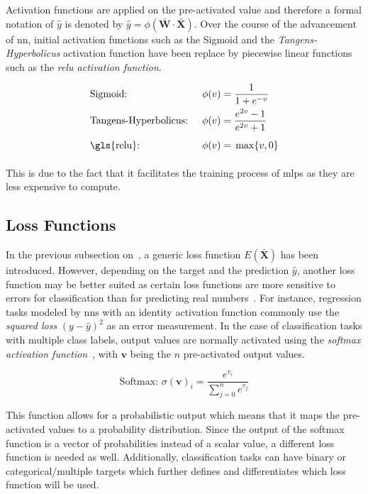 \documentclass[draft,final]{vutinfth} %
\newcommand{\p}[1]{see p. #1}
\begin{document}
    \footnotetext{\cite[\p{13}]{aggarwal_neural_2018}}

    Activation functions are applied on the pre-activated value and therefore a formal notation of $\hat{y}$ is denoted by $\hat{y}=\phi(\bar{\mathbf{W}}\cdot\bar{\mathbf{X}})$.
    Over the course of the advancement of \gls{nn}, initial activation functions such as the Sigmoid and the \textit{Tangens-Hyperbolicus} activation function have been replace by piecewise linear functions such as the \textit{\gls{relu} activation function}.

    \begin{align*}
        &\text{Sigmoid: } &  \phi(v) & = \frac{1}{1+e^{-v}} \\
        &\text{Tangens-Hyperbolicus: } &  \phi(v) &= \frac{e^{2v}-1}{e^{2v}+1} \\
        &\text{\gls{relu}: } &  \phi(v)& = \vphantom{\frac11} \max\{v,0\}
    \end{align*}

    This is due to the fact that it facilitates the training process of \gls{mlp}s as they are less expensive to compute.

    \subsection{Loss Functions}
    In the previous subsection on~, a generic loss function $E(\bar{\mathbf{X}})$ has been introduced.
    However, depending on the target and the prediction $\hat{y}$, another loss function may be better suited as certain loss functions are more sensitive to errors for classification than for predicting real numbers~\citep{aggarwal_neural_2018}.
    For instance, regression tasks modeled by \gls{nn}s with an identity activation function commonly use the \textit{squared loss} $(y - \hat{y})^2$ as an error measurement.
    In the case of classification tasks with multiple class labels, output values are normally activated using the \textit{softmax activation function}~\citep{goodfellow_deep_2016}, with $\mathbf{v}$ being the $n$ pre-activated output values.

    \begin{equation}
        \text{Softmax: } \sigma(\mathbf{v})_i = \frac{e^{v_i}}{\sum_{j=0}^{n}e^{v_j}}
    \end{equation}

    This function allows for a probabilistic output which means that it maps the pre-activated values to a probability distribution.
    Since the output of the softmax function is a vector of probabilities instead of a scalar value, a different loss function is needed as well.
    Additionally, classification tasks can have binary or categorical/multiple targets which further defines and differentiates which loss function will be used.
\end{document}
